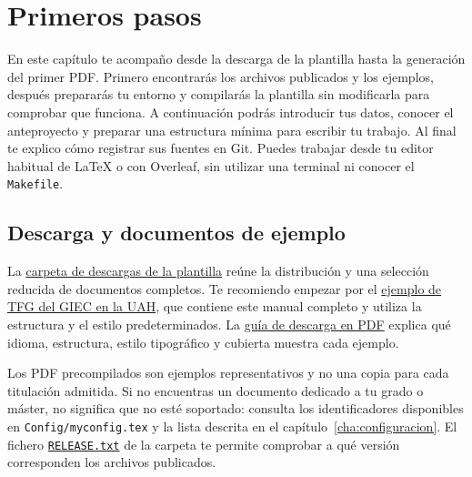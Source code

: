 %

\chapter{Primeros pasos}
\label{cha:primeros-pasos}

En este capítulo te acompaño desde la descarga de la plantilla hasta la generación del primer PDF. Primero encontrarás los archivos publicados y los ejemplos, después prepararás tu entorno y compilarás la plantilla sin modificarla para comprobar que funciona. A continuación podrás introducir tus datos, conocer el anteproyecto y preparar una estructura mínima para escribir tu trabajo. Al final te explico cómo registrar sus fuentes en Git. Puedes trabajar desde tu editor habitual de \LaTeX{} o con Overleaf, sin utilizar una terminal ni conocer el \texttt{Makefile}.

\section{Descarga y documentos de ejemplo}
\label{sec:descarga-ejemplos}

La \href{https://www.dropbox.com/sh/mm6fwh3ruuuyjz2/AABDUmo7Xj1S968FeJgbmFPva?dl=0}{carpeta de descargas de la plantilla} reúne la distribución y una selección reducida de documentos completos. Te recomiendo empezar por el \href{https://www.dropbox.com/scl/fi/wwzbaow0g4cgs7euxvwxy/TFG-GIEC-spanish.pdf?rlkey=2x54yp52avfad67a2fdl3esmv&raw=1}{ejemplo de TFG del GIEC en la UAH}, que contiene este manual completo y utiliza la estructura y el estilo predeterminados. La \href{https://www.dropbox.com/scl/fi/n4jtan9a5v06cc1cp7n4h/01-DOWNLOAD-GUIDE.pdf?rlkey=ux7d8ox85zwlpwhr6nyjvx7zk&raw=1}{guía de descarga en PDF} explica qué idioma, estructura, estilo tipográfico y cubierta muestra cada ejemplo.

Los PDF precompilados son ejemplos representativos y no una copia para cada titulación admitida. Si no encuentras un documento dedicado a tu grado o máster, no significa que no esté soportado: consulta los identificadores disponibles en \texttt{Config/myconfig.tex} y la lista descrita en el capítulo~\ref{cha:configuracion}. El fichero \href{https://www.dropbox.com/scl/fi/2ivatwrcka30uiuzfr3ru/RELEASE.txt?rlkey=mu865s6qbkmchgie0nt3cl7mw&raw=1}{\texttt{RELEASE.txt}} de la carpeta te permite comprobar a qué versión corresponden los archivos publicados.

